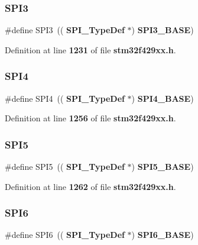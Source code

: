 \subsubsection{S\+P\+I3\hspace{0.1cm}{\footnotesize\ttfamily [2/2]}}
{\footnotesize\ttfamily \#define S\+P\+I3~((\textbf{ S\+P\+I\+\_\+\+Type\+Def} $\ast$) \textbf{ S\+P\+I3\+\_\+\+B\+A\+SE})}



Definition at line \textbf{ 1231} of file \textbf{ stm32f429xx.\+h}.

\mbox{\label{group__Peripheral__declaration_ga2a2e6edef68cfe1946f39a5033da2301}} 
\subsubsection{S\+P\+I4}
{\footnotesize\ttfamily \#define S\+P\+I4~((\textbf{ S\+P\+I\+\_\+\+Type\+Def} $\ast$) \textbf{ S\+P\+I4\+\_\+\+B\+A\+SE})}



Definition at line \textbf{ 1256} of file \textbf{ stm32f429xx.\+h}.

\mbox{\label{group__Peripheral__declaration_ga5e676c061e19ced149b7c6de6b8985e5}} 
\subsubsection{S\+P\+I5}
{\footnotesize\ttfamily \#define S\+P\+I5~((\textbf{ S\+P\+I\+\_\+\+Type\+Def} $\ast$) \textbf{ S\+P\+I5\+\_\+\+B\+A\+SE})}



Definition at line \textbf{ 1262} of file \textbf{ stm32f429xx.\+h}.

\mbox{\label{group__Peripheral__declaration_ga0f05da7f4b924ab39c1f8afcea225074}} 
\subsubsection{S\+P\+I6}
{\footnotesize\ttfamily \#define S\+P\+I6~((\textbf{ S\+P\+I\+\_\+\+Type\+Def} $\ast$) \textbf{ S\+P\+I6\+\_\+\+B\+A\+SE})}



